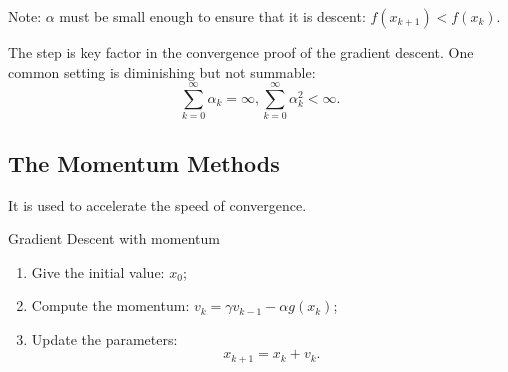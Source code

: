 \documentclass[11pt]{article} %
\begin{document}
Note: $\alpha$ must be small enough to ensure that it is descent: $f(x_{k+1})< f(x_{k})$.

The step is key factor in the convergence proof of the gradient descent.
One common setting is diminishing but not summable: $$\sum_{k=0}^{\infty} {\alpha}_{k}= \infty,\sum_{k=0}^{\infty} {\alpha}_{k}^{2}< \infty. $$

\subsection{The Momentum Methods}
It is used to accelerate the speed of convergence.
\begin{algorithm}[htb]
\caption{Gradient Descent with momentum}
\label{momentum}
\begin{enumerate}
 \item Give the initial value: $x_0$;
 \item Compute the momentum: $v_k= \gamma  v_{k-1} -\alpha g({x}_k)$;
 \item Update the parameters: $${x}_{k+1}={x}_k + v_k .$$
\end{enumerate}

\end{algorithm}
\end{document}
